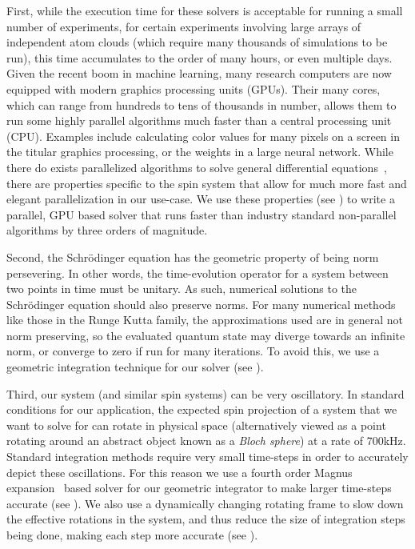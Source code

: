 \documentclass{jors}
\begin{document}
	First, while the execution time for these solvers is acceptable for running a small number of experiments, for certain experiments involving large arrays of independent atom clouds (which require many thousands of simulations to be run), this time accumulates to the order of many hours, or even multiple days.
	Given the recent boom in machine learning, many research computers are now equipped with modern graphics processing units (GPUs).
	Their many cores, which can range from hundreds to tens of thousands in number, allows them to run some highly parallel algorithms much faster than a central processing unit (CPU).
	Examples include calculating color values for many pixels on a screen in the titular graphics processing, or the weights in a large neural network.
	While there do exists parallelized algorithms to solve general differential equations~\cite{lions_resolution_2001}, there are properties specific to the spin system that allow for much more fast and elegant parallelization in our use-case.
	We use these properties (see \emph{}) to write a parallel, GPU based solver that runs faster than industry standard non-parallel algorithms by three orders of magnitude.

	Second, the Schr\"odinger equation has the geometric property of being norm persevering.
	In other words, the time-evolution operator for a system between two points in time must be unitary.
	As such, numerical solutions to the Schr\"odinger equation should also preserve norms.
	For many numerical methods like those in the Runge Kutta family, the approximations used are in general not norm preserving, so the evaluated quantum state may diverge towards an infinite norm, or converge to zero if run for many iterations.
	To avoid this, we use a geometric integration technique for our solver (see \emph{}).

	Third, our system (and similar spin systems) can be very oscillatory.
	In standard conditions for our application, the expected spin projection of a system that we want to solve for can rotate in physical space (alternatively viewed as a point rotating around an abstract object known as a \emph{Bloch sphere}) at a rate of 700kHz.
	Standard integration methods require very small time-steps in order to accurately depict these oscillations.
	For this reason we use a fourth order Magnus expansion~\cite{magnus_exponential_1954,blanes_magnus_2009} based solver for our geometric integrator to make larger time-steps accurate (see \emph{}).
	We also use a dynamically changing rotating frame to slow down the effective rotations in the system, and thus reduce the size of integration steps being done, making each step more accurate (see \emph{}).
\end{document}
